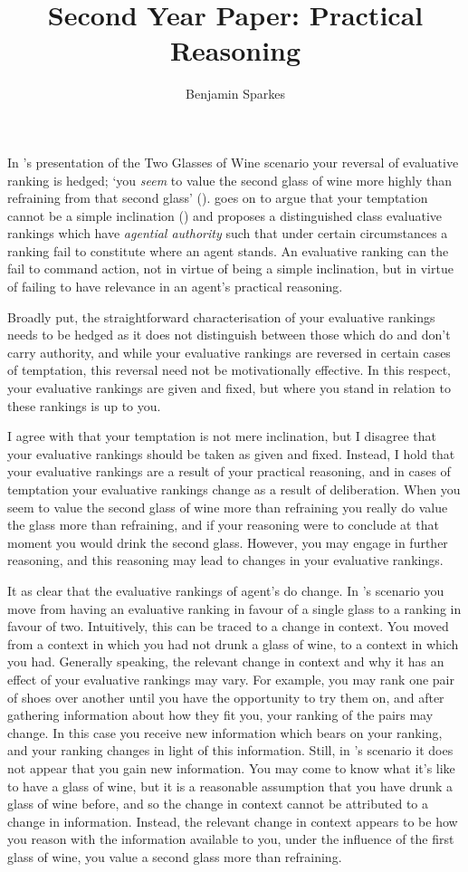\documentclass[10pt]{article}
\title{Second Year Paper: Practical Reasoning}
\author{Benjamin Sparkes}
\begin{document}
In \citeauthor{Bratman:2007ab}'s presentation of the Two Glasses of Wine scenario your reversal of evaluative ranking is hedged; `you \emph{seem} to value the second glass of wine more highly than refraining from that second glass' (\citeyear[emphasis added][257]{Bratman:2007ab}).
\citeauthor{Bratman:2007ab} goes on to argue that your temptation cannot be a simple inclination (\citeyear[cf.][258]{Bratman:2007ab}) and proposes a distinguished class evaluative rankings which have \emph{agential authority} such that under certain circumstances a ranking fail to constitute where an agent stands.
An evaluative ranking can the fail to command action, not in virtue of being a simple inclination, but in virtue of failing to have relevance in an agent's practical reasoning.

Broadly put, the straightforward characterisation of your evaluative rankings needs to be hedged as it does not distinguish between those which do and don't carry authority, and while your evaluative rankings are reversed in certain cases of temptation, this reversal need not be motivationally effective.
In this respect, your evaluative rankings are given and fixed, but where you stand in relation to these rankings is up to you.

I agree with \citeauthor{Bratman:2007ab} that your temptation is not mere inclination, but I disagree that your evaluative rankings should be taken as given and fixed.
Instead, I hold that your evaluative rankings are a result of your practical reasoning, and in cases of temptation your evaluative rankings change as a result of deliberation.
When you seem to value the second glass of wine more than refraining you really do value the glass more than refraining, and if your reasoning were to conclude at that moment you would drink the second glass.
However, you may engage in further reasoning, and this reasoning may lead to changes in your evaluative rankings.

It as clear that the evaluative rankings of agent's do change.
In \citeauthor{Bratman:2007ab}'s scenario you move from having an evaluative ranking in favour of a single glass to a ranking in favour of two.
Intuitively, this can be traced to a change in context.
You moved from a context in which you had not drunk a glass of wine, to a context in which you had.
Generally speaking, the relevant change in context and why it has an effect of your evaluative rankings may vary.
For example, you may rank one pair of shoes over another until you have the opportunity to try them on, and after gathering information about how they fit you, your ranking of the pairs may change.
In this case you receive new information which bears on your ranking, and your ranking changes in light of this information.
Still, in \citeauthor{Bratman:2007ab}'s scenario it does not appear that you gain new information.
You may come to know what it's like to have a glass of wine, but it is a reasonable assumption that you have drunk a glass of wine before, and so the change in context cannot be attributed to a change in information.
Instead, the relevant change in context appears to be how you reason with the information available to you, under the influence of the first glass of wine, you value a second glass more than refraining.
\end{document}
